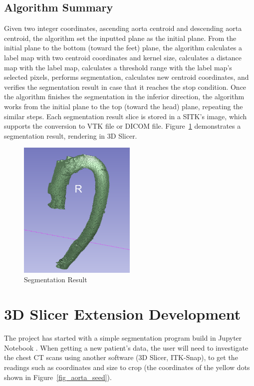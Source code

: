 \subsection{Algorithm Summary}
Given two integer coordinates, ascending aorta centroid and descending aorta centroid, the algorithm set the inputted plane as the initial plane. From the initial plane to the bottom (toward the feet) plane, the algorithm calculates a label map with two centroid coordinates and kernel size, calculates a distance map with the label map, calculates a threshold range with the label map's selected pixels, performs segmentation, calculates new centroid coordinates, and verifies the segmentation result in case that it reaches the stop condition. Once the algorithm finishes the segmentation in the inferior direction, the algorithm works from the initial plane to the top (toward the head) plane, repeating the similar steps. Each segmentation result slice is stored in a SITK's image, which supports the conversion to VTK file or DICOM file. Figure~\ref{fig_sr} demonstrates a segmentation result, rendering in 3D Slicer.

\begin{figure}[H]
    \centering
    \includegraphics[width=0.5\textwidth]{figures/AGR/segmentation_result.png}
    \caption[Segmentation Result]{Segmentation Result}
    \label{fig_sr}
\end{figure}

\section{3D Slicer Extension Development}
The project has started with a simple segmentation program build in Jupyter Notebook \cite{Kluyver2016jupyter}. When getting a new patient's data, the user will need to investigate the chest CT scans using another software (3D Slicer, ITK-Snap), to get the readings such as coordinates and size to crop (the coordinates of the yellow dots shown in Figure~\ref{fig_aorta_seed}).


